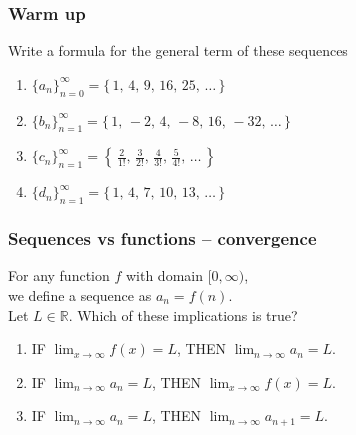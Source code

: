 \begin{frame}[t]
	\frametitle{Warm up}

	Write a formula for the general term of these sequences
	\vfill
	\begin{enumerate}
		\item $\displaystyle \{a_{n}\}_{n=0}^{\infty}= \{ \, 1, \, 4, \, 9, \, 16, \,
			25, \, \ldots \, \}$
			\vfill

		\item $\displaystyle \{b_{n}\}_{n=1}^{\infty}= \{ \, 1, \, -2, \, 4, \, -8, \,
			16, \, -32, \, \ldots \, \}$
			\vfill

		\item $\displaystyle \{c_{n}\}_{n=1}^{\infty}= \left\{ \, \frac{2}{1!}, \, \frac{3}{2!}
			, \, \frac{4}{3!}, \, \frac{5}{4!}, \, \ldots \, \right\}$
			\vfill

		\item $\displaystyle \{d_{n}\}_{n=1}^{\infty}= \{ \, 1, \, 4, \, 7, \, 10, \,
			13, \, \ldots \, \}$
	\end{enumerate}
\end{frame}

\begin{frame}[t]
	\frametitle{Sequences vs functions -- convergence}

	For any function $f$ with domain $[0, \infty)$, \\ we define a sequence as $a_{n}
	= f(n)$. \\ Let $L \in \mathbb{R}$. Which of these implications is true?

	\begin{enumerate}
		\item IF $\displaystyle \lim_{x \to \infty}f(x) = L$, \; THEN
			$\displaystyle \lim_{n \to \infty}a_{n}= L$.
			\vfill

		\item IF $\displaystyle \lim_{n \to \infty}a_{n}= L$, \; THEN
			$\displaystyle \lim_{x \to \infty}f(x) = L$.
			\vfill

		\item IF $\displaystyle \lim_{n \to \infty}a_{n}= L$, \; THEN
			$\displaystyle \lim_{n \to \infty}a_{n+1}= L$.
	\end{enumerate}
\end{frame}

